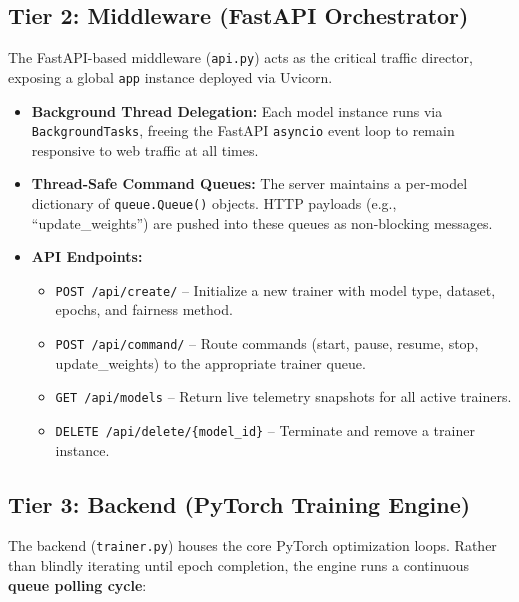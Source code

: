 \documentclass[12pt,a4paper]{article}
\begin{document}
\subsection{Tier 2: Middleware (FastAPI Orchestrator)}

The FastAPI-based middleware (\texttt{api.py}) acts as the critical traffic director, exposing a global \texttt{app} instance deployed via Uvicorn.

\begin{itemize}
    \item \textbf{Background Thread Delegation:} Each model instance runs via \texttt{BackgroundTasks}, freeing the FastAPI \texttt{asyncio} event loop to remain responsive to web traffic at all times.
    \item \textbf{Thread-Safe Command Queues:} The server maintains a per-model dictionary of \texttt{queue.Queue()} objects. HTTP payloads (e.g., ``update\_weights'') are pushed into these queues as non-blocking messages.
    \item \textbf{API Endpoints:}
        \begin{itemize}
            \item \texttt{POST /api/create/} -- Initialize a new trainer with model type, dataset, epochs, and fairness method.
            \item \texttt{POST /api/command/} -- Route commands (start, pause, resume, stop, update\_weights) to the appropriate trainer queue.
            \item \texttt{GET /api/models} -- Return live telemetry snapshots for all active trainers.
            \item \texttt{DELETE /api/delete/\{model\_id\}} -- Terminate and remove a trainer instance.
        \end{itemize}
\end{itemize}

\subsection{Tier 3: Backend (PyTorch Training Engine)}

The backend (\texttt{trainer.py}) houses the core PyTorch optimization loops. Rather than blindly iterating until epoch completion, the engine runs a continuous \textbf{queue polling cycle}:
\end{document}
